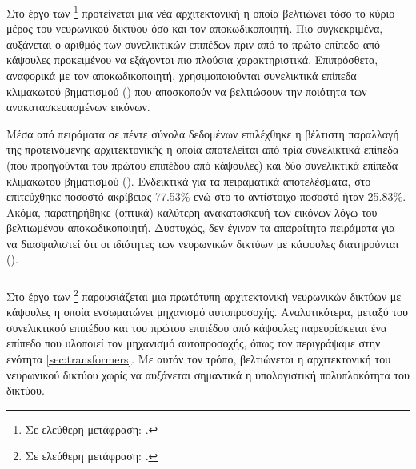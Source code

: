 \subsubsection{}

Στο έργο των  \footnote{Σε ελεύθερη μετάφραση: .} \cite{liu2019fsc} προτείνεται μια νέα αρχιτεκτονική η οποία βελτιώνει τόσο το κύριο μέρος του νευρωνικού δικτύου όσο και τον αποκωδικοποιητή. Πιο συγκεκριμένα, αυξάνεται ο αριθμός των συνελικτικών επιπέδων πριν από το πρώτο επίπεδο από κάψουλες προκειμένου να εξάγονται πιο πλούσια χαρακτηριστικά. Επιπρόσθετα, αναφορικά με τον αποκωδικοποιητή, χρησιμοποιούνται συνελικτικά επίπεδα κλιμακωτού βηματισμού () που αποσκοπούν να βελτιώσουν την ποιότητα των ανακατασκευασμένων εικόνων. \par

Μέσα από πειράματα σε πέντε σύνολα δεδομένων επιλέχθηκε η βέλτιστη παραλλαγή της προτεινόμενης αρχιτεκτονικής η οποία αποτελείται από τρία συνελικτικά επίπεδα (που προηγούνται του πρώτου επιπέδου από κάψουλες) και δύο συνελικτικά επίπεδα κλιμακωτού βηματισμού (). Ενδεικτικά για τα πειραματικά αποτελέσματα, στο  επιτεύχθηκε ποσοστό ακρίβειας 77.53\% ενώ στο  το αντίστοιχο ποσοστό ήταν 25.83\%. Ακόμα, παρατηρήθηκε (οπτικά) καλύτερη ανακατασκευή των εικόνων λόγω του βελτιωμένου αποκωδικοποιητή. Δυστυχώς, δεν έγιναν τα απαραίτητα πειράματα για να διασφαλιστεί ότι οι ιδιότητες των νευρωνικών δικτύων με κάψουλες διατηρούνται ().

\subsubsection{}

Στο έργο των  \footnote{Σε ελεύθερη μετάφραση: .} \cite{hoogi2019self} παρουσιάζεται μια πρωτότυπη αρχιτεκτονική νευρωνικών δικτύων με κάψουλες η οποία ενσωματώνει μηχανισμό αυτοπροσοχής. Αναλυτικότερα, μεταξύ του συνελικτικού επιπέδου και του πρώτου επιπέδου από κάψουλες παρευρίσκεται ένα επίπεδο που υλοποιεί τον μηχανισμό αυτο\textendash προσοχής, όπως τον περιγράψαμε στην ενότητα \ref{sec:transformers}. Με αυτόν τον τρόπο, βελτιώνεται η αρχιτεκτονική του νευρωνικού δικτύου χωρίς να αυξάνεται σημαντικά η υπολογιστική πολυπλοκότητα του δικτύου.\par

